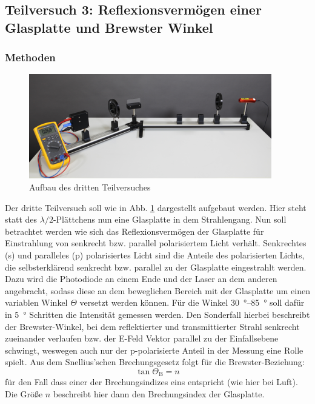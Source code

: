 \subsection{Teilversuch 3: Reflexionsvermögen einer Glasplatte und Brewster Winkel}

	\subsubsection*{Methoden}
		
		\begin{figure}[ht]
			\centering
			\includegraphics[width=\textwidth]{bilder/Brewster-Winkel.png}
			\caption{Aufbau des dritten Teilversuches\cite{WWU}}
			\label{fig:Glasplatte}	
		\end{figure}
		Der dritte Teilversuch soll wie in Abb. \ref{fig:Glasplatte} dargestellt aufgebaut werden.
		Hier steht statt des $\lambda/2$-Plättchens nun eine Glasplatte in dem Strahlengang.
		Nun soll betrachtet werden wie sich das Reflexionsvermögen der Glasplatte für Einstrahlung von senkrecht bzw. parallel polarisiertem Licht verhält.
		Senkrechtes (s) und paralleles (p) polarisiertes Licht sind die Anteile des polarisierten Lichts, die selbsterklärend senkrecht bzw. parallel zu der Glasplatte eingestrahlt werden.
		Dazu wird die Photodiode an einem Ende und der Laser an dem anderen angebracht, sodass diese an dem beweglichen Bereich mit der Glasplatte um einen variablen Winkel $\Theta$ versetzt werden können.
		Für die Winkel \SIrange{30}{85}{\degree} soll dafür in \SI{5}{\degree} Schritten die Intensität gemessen werden.
		Den Sonderfall hierbei beschreibt der Brewster-Winkel, bei dem reflektierter und transmittierter Strahl senkrecht zueinander verlaufen bzw. der E-Feld Vektor parallel zu der Einfallsebene schwingt, weswegen auch nur der p-polarisierte Anteil in der Messung eine Rolle spielt.
		Aus dem Snellius'schen Brechungsgesetz folgt für die Brewster-Beziehung:
		\begin{equation} \label{eq:Brewster}
			\tan{\Theta_\text{B}} = n
		\end{equation}
		für den Fall dass einer der Brechungsindizes eins entspricht (wie hier bei Luft).
		Die Größe $n$ beschreibt hier dann den Brechungsindex der Glasplatte.

